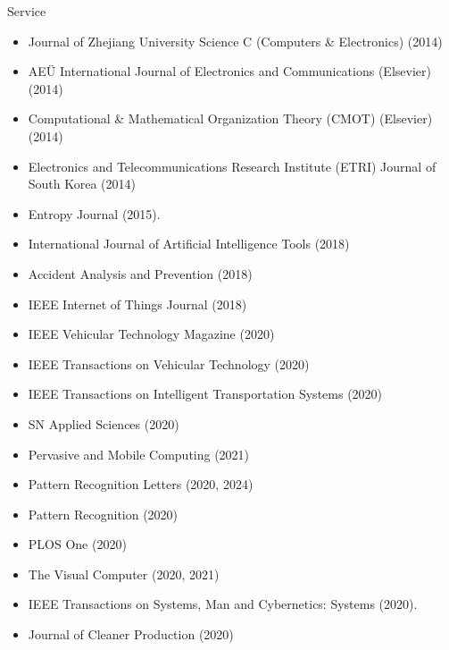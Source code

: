 \begin{category}{Service}
\begin{itemize}
\item Journal of Zhejiang University Science C (Computers \& Electronics) (2014)

\item AE{\"U} International Journal of Electronics and Communications (Elsevier) (2014)

\item Computational \& Mathematical Organization Theory (CMOT) (Elsevier) (2014)

\item Electronics and Telecommunications Research Institute (ETRI) Journal of South Korea (2014)

\item Entropy Journal (2015).

\item International Journal of Artificial Intelligence Tools (2018) %

\item Accident Analysis and Prevention (2018) %

\item IEEE Internet of Things Journal (2018)

\item IEEE Vehicular Technology Magazine (2020)

\item IEEE Transactions on Vehicular Technology (2020)

\item IEEE Transactions on Intelligent Transportation Systems (2020)

\item SN Applied Sciences (2020)

\item Pervasive and Mobile Computing (2021)

\item Pattern Recognition Letters (2020, 2024)

\item Pattern Recognition (2020)

\item PLOS One (2020)

\item The Visual Computer (2020, 2021)

\item IEEE Transactions on Systems, Man and Cybernetics: Systems (2020).

\item Journal of Cleaner Production (2020)


\end{itemize}
\end{category}
